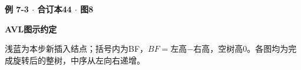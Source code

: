 {\color{ink}\bfseries 例 7-3 \(\cdot \) 合订本44 \(\cdot \) 图8}\par \textbf{AVL图示约定}\par\vspace{2bp}浅蓝为本步新插入结点；括号内为BF，\(BF=\allowbreak{}\)左高\(-\)右高，空树高0。各图均为完成旋转后的整树，中序从左向右递增。
